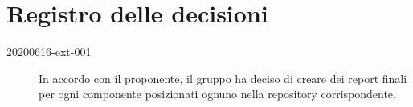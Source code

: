 \documentclass{article}
\begin{document}
\newpage
\section{Registro delle decisioni}%
\label{sec:registro_delle_decisioni}

\begin{description}
  \item[20200616-ext-001] In accordo con il proponente, il gruppo ha deciso di creare dei report finali per ogni componente posizionati ognuno nella repository corrispondente.
\end{description}
\end{document}
